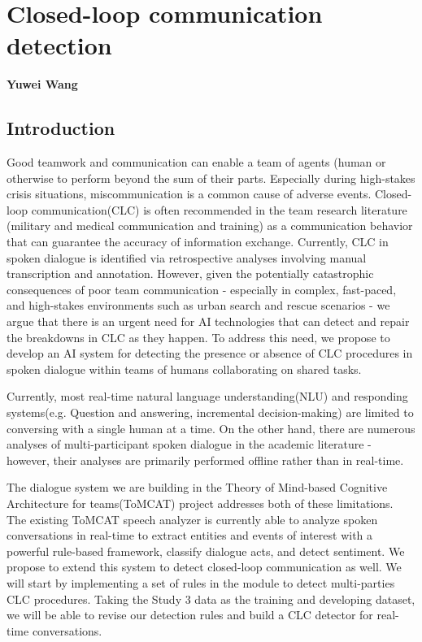 \chapter{Closed-loop communication detection}
\label{ch:clc}
\textbf{Yuwei Wang}

\section{Introduction}

Good teamwork and communication can enable a team of agents (human or otherwise
to perform beyond the sum of their parts\citep{roberts2022state}. Especially
during high-stakes crisis situations, miscommunication is a common cause of
adverse events\citep{taylor2014description,davis2017operative}. Closed-loop
communication(CLC) is often recommended in the team research literature
(military and medical communication and training) as a communication behavior
that can guarantee the accuracy of information
exchange\citep{marzuki2019closed}. Currently, CLC in spoken dialogue is
identified via retrospective analyses involving manual transcription and
annotation. However, given the potentially catastrophic consequences of poor
team communication\citep{flin2004identifying} - especially in complex,
fast-paced, and high-stakes environments such as urban search and rescue
scenarios - we argue that there is an urgent need for AI technologies that can
detect and repair the breakdowns in CLC as they happen. To address this need,
we propose to develop an AI system for detecting the presence or absence of CLC
procedures in spoken dialogue within teams of humans collaborating on shared
tasks.

Currently, most real-time natural language understanding(NLU) and responding
systems(e.g. Question and answering\citep{hawkins2017you}, incremental
decision-making\citep{devault2011detecting}) are limited to conversing with a
single human at a time. On the other hand, there are numerous analyses of
multi-participant spoken dialogue in the academic literature - however, their
analyses are primarily performed offline rather than in real-time. 

The dialogue system we are building in the Theory of Mind-based Cognitive
Architecture for teams(ToMCAT) project addresses both of these limitations. The
existing ToMCAT speech analyzer is currently able to analyze spoken
conversations in real-time to extract entities and events of interest with a
powerful rule-based framework\citep{valenzuela-escarcega-etal-2016-odins},
classify dialogue acts, and detect sentiment. We propose to extend this system
to detect closed-loop communication as well. We will start by implementing a
set of rules in the module to detect multi-parties CLC procedures. Taking the
Study 3 data as the training and developing dataset, we will be able to revise
our detection rules and build a CLC detector for real-time conversations.

